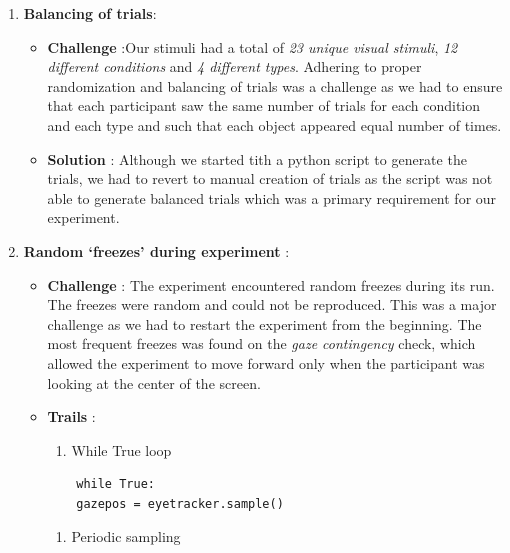 \documentclass[
  a4paper,
]{article}
\providecommand{\tightlist}{%
  \setlength{\itemsep}{0pt}\setlength{\parskip}{0pt}}\usepackage{longtable,booktabs,array}
\begin{document}
\begin{enumerate}
\def\labelenumi{\arabic{enumi}.}
\tightlist
\item
  \textbf{Balancing of trials}:

  \begin{itemize}
  \tightlist
  \item
    \textbf{Challenge} :Our stimuli had a total of \emph{23 unique
    visual stimuli}, \emph{12 different conditions} and \emph{4
    different types}. Adhering to proper randomization and balancing of
    trials was a challenge as we had to ensure that each participant saw
    the same number of trials for each condition and each type and such
    that each object appeared equal number of times.
  \item
    \textbf{Solution} : Although we started tith a python script to
    generate the trials, we had to revert to manual creation of trials
    as the script was not able to generate balanced trials which was a
    primary requirement for our experiment.
  \end{itemize}
\item
  \textbf{Random `freezes' during experiment} :

  \begin{itemize}
  \item
    \textbf{Challenge} : The experiment encountered random freezes
    during its run. The freezes were random and could not be reproduced.
    This was a major challenge as we had to restart the experiment from
    the beginning. The most frequent freezes was found on the \emph{gaze
    contingency} check, which allowed the experiment to move forward
    only when the participant was looking at the center of the screen.
  \item
    \textbf{Trails} :

    \begin{enumerate}
    \def\labelenumii{\arabic{enumii}.}
    \tightlist
    \item
      While True loop
    \end{enumerate}

\begin{verbatim}
    while True:
    gazepos = eyetracker.sample()
\end{verbatim}

    \begin{enumerate}
    \def\labelenumii{\arabic{enumii}.}
    \setcounter{enumii}{1}
    \tightlist
    \item
      Periodic sampling
    \end{enumerate}


\end{itemize}
\end{enumerate}
\end{document}
